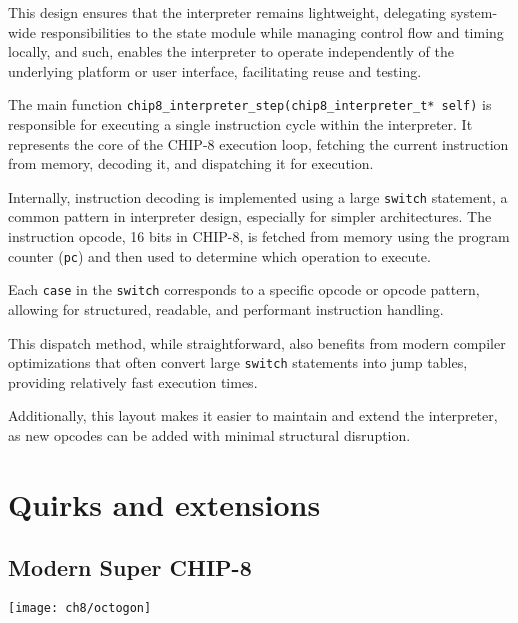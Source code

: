\par This design ensures that the interpreter remains lightweight, delegating system-wide responsibilities to the state module while managing control flow and timing locally, and such, enables the interpreter to operate independently of the underlying platform or user interface, facilitating reuse and testing.

\par The main function \texttt{chip8\_interpreter\_step(chip8\_interpreter\_t* self)} is responsible for executing a single instruction cycle within the interpreter. It represents the core of the CHIP-8 execution loop, fetching the current instruction from memory, decoding it, and dispatching it for execution.

\par Internally, instruction decoding is implemented using a large \texttt{switch} statement, a common pattern in interpreter design, especially for simpler architectures. The instruction opcode, 16 bits in CHIP-8, is fetched from memory using the program counter (\texttt{pc}) and then used to determine which operation to execute.

\par Each \texttt{case} in the \texttt{switch} corresponds to a specific opcode or opcode pattern, allowing for structured, readable, and performant instruction handling.

\par This dispatch method, while straightforward, also benefits from modern compiler optimizations that often convert large \texttt{switch} statements into jump tables, providing relatively fast execution times.

\par Additionally, this layout makes it easier to maintain and extend the interpreter, as new opcodes can be added with minimal structural disruption.

\section{Quirks and extensions}
\label{sec:ch3sec4}

\subsection{Modern Super CHIP-8}
\label{subsec:ch3sec4sub1}

\begin{minipage}{\linewidth}
\texttt{[image: ch8/octogon]}
\centering
{}
\end{minipage}

